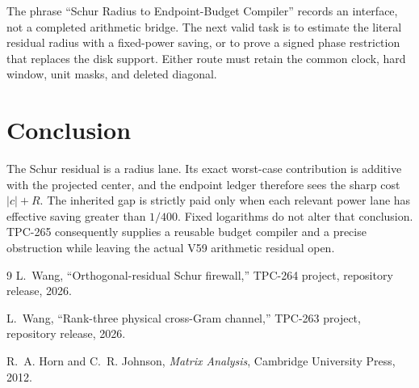 \documentclass[11pt]{article}
\theoremstyle{definition}
\begin{document}
The phrase ``Schur Radius to Endpoint-Budget Compiler'' records an interface,
not a completed arithmetic bridge.  The next valid task is to estimate the
literal residual radius with a fixed-power saving, or to prove a signed phase
restriction that replaces the disk support.  Either route must retain the
common clock, hard window, unit masks, and deleted diagonal.

\section{Conclusion}

The Schur residual is a radius lane.  Its exact worst-case contribution is
additive with the projected center, and the endpoint ledger therefore sees the
sharp cost $|c|+R$.  The inherited gap is strictly paid only when each relevant
power lane has effective saving greater than $1/400$.  Fixed logarithms do not
alter that conclusion.  TPC-265 consequently supplies a reusable budget
compiler and a precise obstruction while leaving the actual V59 arithmetic
residual open.

\begin{thebibliography}{9}
L.~Wang, ``Orthogonal-residual Schur firewall,'' TPC-264 project,
repository release, 2026.

L.~Wang, ``Rank-three physical cross-Gram channel,'' TPC-263 project,
repository release, 2026.

R.~A. Horn and C.~R. Johnson, \emph{Matrix Analysis}, Cambridge University
Press, 2012.
\end{thebibliography}
\end{document}
